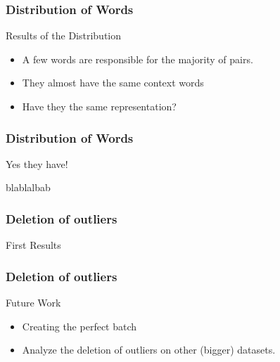 \begin{frame}
\frametitle{Distribution of Words}
\begin{Large}
Results of the Distribution
\end{Large}
\begin{itemize}
\item A few words are responsible for the majority of pairs. 
\item They almost have the same context words
\item Have they the same representation? 
\end{itemize}
  \end{frame}
  \begin{frame}
\frametitle{Distribution of Words}
\begin{Large}
Yes they have!
\end{Large}
blablalbab
  \end{frame}
    \begin{frame}
\frametitle{Deletion of outliers}
\begin{Large}
First Results 
\end{Large}
  \end{frame}
      \begin{frame}
\frametitle{Deletion of outliers}
\begin{Large}
Future Work 
\end{Large}
\begin{itemize}
\item Creating the perfect batch 
\item Analyze the deletion of outliers on other (bigger) datasets.
\end{itemize}
  \end{frame}